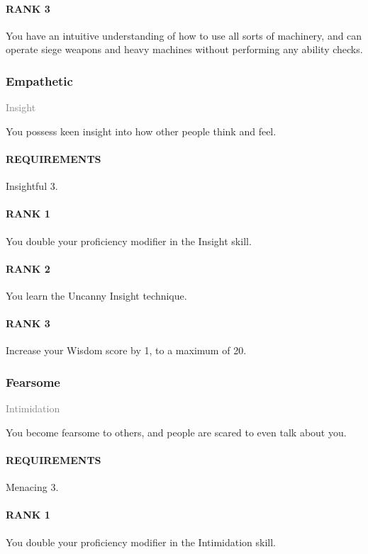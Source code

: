 \paragraph{RANK 3} You have an intuitive understanding of how to use all sorts of machinery, and can operate siege weapons and heavy machines without performing any ability checks.

\subsubsection{Empathetic} \label{feat::empathetic}
\small{\textcolor{gray}{Insight}}

\normalsize
You possess keen insight into how other people think and feel.
\paragraph{REQUIREMENTS} Insightful 3.
\paragraph{RANK 1} You double your proficiency modifier in the Insight skill.
\paragraph{RANK 2} You learn the Uncanny Insight technique.
\paragraph{RANK 3} Increase your Wisdom score by 1, to a maximum of 20.

\subsubsection{Fearsome} \label{feat::fearsome}
\small{\textcolor{gray}{Intimidation}}

\normalsize
You become fearsome to others, and people are scared to even talk about you.
\paragraph{REQUIREMENTS} Menacing 3.
\paragraph{RANK 1} You double your proficiency modifier in the Intimidation skill.

